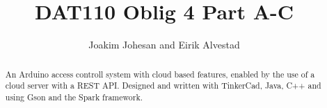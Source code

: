 \documentclass[11pt]{article}
\begin{document}
\title{DAT110 Oblig 4 Part A-C}

\author{Joakim Johesan and Eirik Alvestad}

\maketitle

\begin{abstract}
An Arduino access controll system with cloud based features, enabled by the use of a cloud server with a REST API. Designed and written with TinkerCad, Java, C++ and using Gson and the Spark framework.
\end{abstract}
















\end{document}
